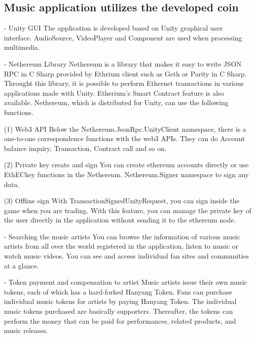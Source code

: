 \documentclass[conference]{IEEEtran}
\begin{document}
\subsection{Music application utilizes the developed coin}
- Unity GUI
The application is developed based on Unity graphical user interface. AudioSource, VideoPlayer and Component are used when processing multimedia.

-	 Nethereum Library
Nethereum is a library that makes it easy to write JSON RPC in C Sharp provided by Ethrium client such as Geth or Parity in C Sharp.  Throught this library, it is possible to perform Ethernet transactions in various applications made with Unity. Etherium’s Smart Contract feature is also available. 
Nethereum, which is distributed for Unity, can use the following functions.

(1)	Web3 API
Below the Nethereum.JsonRpc.UnityClient namespace, there is a one-to-one correspondence functions with the web3 APIs. They can do Account balance inquiry, Transaction, Contract call and so on.

(2)	Private key create and sign
You can create ethereum accounts directly or use EthECkey functions in the Nethereum. Nethereum.Signer namespace to sign any data.

(3)	Offline sign
With TransactionSignedUnityRequest, you can sign inside the game when you are trading. With this feature, you can manage the private key of the user directly in the application without sending it to the ethereum node.

- Searching the music artists
You can browse the information of various music artists from all over the world registered in the application, listen to music or watch music videos. You can see and access individual fan sites and communities at a glance.

-	 Token payment and compensation to artist
Music artists issue their own music tokens, each of which has a hard-forked Hanyang Token. Fans can purchase individual music tokens for artists by paying Hanyang Token. The individual music tokens purchased are basically supporters. Thereafter, the tokens can perform the money that can be paid for performances, related products, and music releases. 
\end{document}
